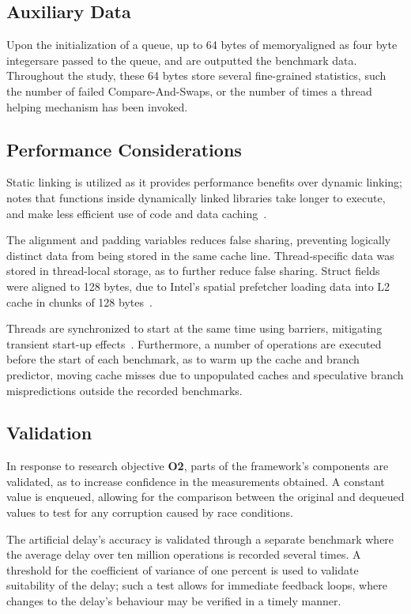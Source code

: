 \subsection{Auxiliary Data}
Upon the initialization of a queue, up to 64 bytes of memory\textemdash aligned as four
byte integers\textemdash are passed to the queue, and are outputted
the benchmark data. Throughout the study, these 64
bytes store several fine-grained statistics, such the number of failed Compare-And-Swaps,
or the number of times a thread helping mechanism has been invoked.

\subsection{Performance Considerations}
Static linking is utilized as it provides performance benefits over dynamic
linking; \citeauthor{fog2020optimizing} notes that functions inside dynamically
linked libraries take longer to execute, and make less efficient use of code
and data caching~\citep[Section~14.11]{fog2020optimizing}.

The alignment and padding variables reduces false sharing, preventing logically
distinct data from being stored in the same cache line.
Thread-specific data was stored in thread-local storage, as to further reduce
false sharing. Struct fields were aligned to 128 bytes, due to
Intel's spatial prefetcher loading data into L2
cache in chunks of 128 bytes~\citep[Section~E.2.5.4]{intelmanualoptimization}.

Threads are synchronized to start at the same time using
barriers, mitigating transient start-up effects~\citep{hoffman2007baskets}.
Furthermore, a number of operations are executed before the start of each
benchmark, as to warm up the cache and branch predictor, moving cache misses
due to unpopulated caches and speculative branch mispredictions outside the
recorded benchmarks.

\subsection{Validation\label{sec:design_and_implementation_validation}}
In response to research objective \textbf{O2}, parts of the framework's
components are validated, as to increase confidence in the measurements
obtained. A constant value is enqueued, allowing for the comparison
between the original and dequeued values to test for any corruption caused by race conditions. 

The artificial delay's accuracy is validated through a separate
benchmark where the average delay over ten million operations is recorded several times.
A threshold for the coefficient of variance of one percent is used
to validate suitability of the delay; such a test allows for immediate feedback
loops, where changes to the delay's behaviour may be verified in a timely
manner.

